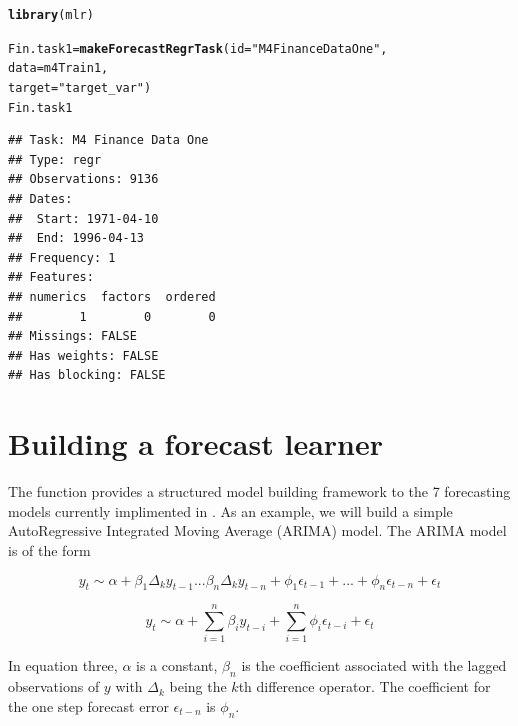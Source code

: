 \documentclass[article]{jss}\usepackage[]{graphicx}\usepackage[]{color}
\makeatletter
\newcommand{\hlstr}[1]{\textcolor[rgb]{0.192,0.494,0.8}{#1}}%
\newcommand{\hlstd}[1]{\textcolor[rgb]{0.345,0.345,0.345}{#1}}%
\newcommand{\hlkwb}[1]{\textcolor[rgb]{0.69,0.353,0.396}{#1}}%
\newcommand{\hlkwc}[1]{\textcolor[rgb]{0.333,0.667,0.333}{#1}}%
\newcommand{\hlkwd}[1]{\textcolor[rgb]{0.737,0.353,0.396}{\textbf{#1}}}%
\newenvironment{kframe}{%
 \def\at@end@of@kframe{}%
 \ifinner\ifhmode%
  \def\at@end@of@kframe{\end{minipage}}%
  \begin{minipage}{\columnwidth}%
 \fi\fi%
 \def\FrameCommand##1{\hskip\@totalleftmargin \hskip-\fboxsep
 \colorbox{shadecolor}{##1}\hskip-\fboxsep
     \hskip-\linewidth \hskip-\@totalleftmargin \hskip\columnwidth}%
 \MakeFramed {\advance\hsize-\width
   \@totalleftmargin\z@ \linewidth\hsize
   \@setminipage}}%
 {\par\unskip\endMakeFramed%
 \at@end@of@kframe}
\newenvironment{knitrout}{}{} %
\makeatother
\begin{document}
\begin{knitrout}
\color{fgcolor}\begin{kframe}
\begin{alltt}
\hlkwd{library}\hlstd{(mlr)}
\end{alltt}


{\ttfamily\noindent\itshape\color{messagecolor}{\#\# Loading required package: ParamHelpers}}\begin{alltt}
\hlstd{Fin.task1} \hlkwb{=} \hlkwd{makeForecastRegrTask}\hlstd{(}\hlkwc{id} \hlstd{=} \hlstr{"M4 Finance Data One"}\hlstd{,}
                                 \hlkwc{data} \hlstd{= m4Train1,}
                                 \hlkwc{target} \hlstd{=} \hlstr{"target_var"}\hlstd{)}
\hlstd{Fin.task1}
\end{alltt}
\begin{verbatim}
## Task: M4 Finance Data One
## Type: regr
## Observations: 9136
## Dates:
##  Start: 1971-04-10 
##  End: 1996-04-13
## Frequency: 1
## Features:
## numerics  factors  ordered 
##        1        0        0 
## Missings: FALSE
## Has weights: FALSE
## Has blocking: FALSE
\end{verbatim}
\end{kframe}
\end{knitrout}

\section{Building a forecast learner}

The  function provides a structured model building framework to the 7 forecasting models currently implimented in . As an example, we will build a simple AutoRegressive Integrated Moving Average (ARIMA) model. The ARIMA model is of the form

\begin{equation}
y_t \sim \alpha + \beta_1 \Delta_k y_{t-1} ... \beta_n \Delta_k y_{t-n} + \phi_1 \epsilon_{t-1} + ... + \phi_n \epsilon_{t-n} + \epsilon_t
\end{equation}

\begin{equation}
y_t \sim \alpha + \sum_{i=1}^n \beta_i y_{t-i} + \sum_{i=1}^n \phi_i \epsilon_{t-i} +\epsilon_t
\end{equation}

In equation three, $\alpha$ is a constant, $\beta_n$ is the coefficient associated with the lagged observations of $y$ with $\Delta_k$ being the $k$th difference operator. The coefficient for the one step forecast error $\epsilon_{t-n}$ is $\phi_n$.
\end{document}
